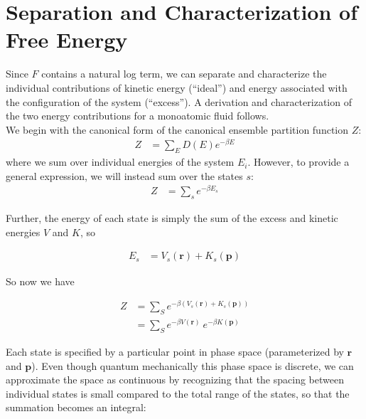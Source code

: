 \documentclass[12pt]{article}
\newcommand{\ignore}[1]{}
\begin{document}

\section{Separation and Characterization of Free Energy}

Since $F$ contains a natural log term, we can separate and characterize the individual contributions of kinetic energy (``ideal'') and energy associated with the configuration of the system (``excess''). A derivation and characterization of the two energy contributions for a monoatomic fluid follows. \\

\ignore{{\color{red} [This should probably go in an appendix. Further: replace $Z_C$ with $Z_{exc}$; fix the to the N on the $Z_{exc}$ term; include the $N!$ into the ideal term; fix the $V(r_1, r_2, ...)$||| All done! NOW: fix the dimensions on the $Z_{id}$ term!]}}

We begin with the canonical form of the canonical ensemble partition function $Z$:
\begin{align}
    Z &= \sum_E D(E) e^{-\beta E}
\end{align}
where we sum over individual energies of the system $E_i$. However, to provide a general expression, we will instead sum over the states $s$:
\begin{align}
    Z &= \sum_s e^{-\beta E_s}
\end{align} 

Further, the energy of each state is simply the sum of the excess and kinetic energies $V$ and $K$, so

\begin{align}
    E_s &= V_s(\mathbf{r}) + K_s(\mathbf{p})
\end{align}

So now we have 

\begin{align}
    Z &= \sum_S e^{-\beta (V_s(\mathbf{r}) + K_s(\mathbf{p}))}\\
    &= \sum_S e^{-\beta V(\mathbf{r})}~e^{-\beta K(\mathbf{p})}
\end{align} 

Each state is specified by a particular point in phase space (parameterized by $\mathbf{r}$ and $\mathbf{p}$). Even though quantum mechanically this phase space is discrete, we can approximate the space as continuous by recognizing that the spacing between individual states is small compared to the total range of the states, so that the summation becomes an integral:
\end{document}
